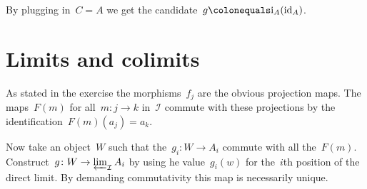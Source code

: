 \begin{exercise}
  By plugging in~$C=A$ we get the candidate~$g\colonequals\mathrm{i}_A(\identity_A)$. 
\end{exercise}


\section{Limits and colimits}

\begin{exercise}
  As stated in the exercise the morphisms~$f_j$ are the obvious projection maps. The maps~$F(m)$ for all~$m\colon j\to k$ in~$\mathcal{I}$ commute with these projections by the identification~$F(m)(a_j)=a_k$.

  Now take an object~$W$ such that the~$g_i\colon W\to A_i$ commute with all the~$F(m)$. Construct~$g\colon W\to\varprojlim_{\mathcal{I}}A_i$ by using he value~$g_i(w)$ for the~$i$th position of the direct limit. By demanding commutativity this map is necessarily unique.
\end{exercise}

